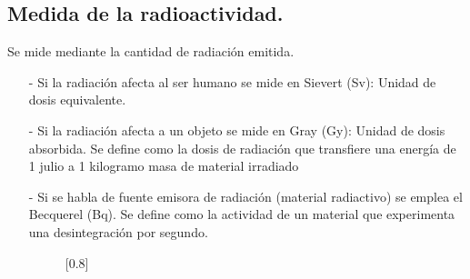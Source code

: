 \subsection{Medida de la radioactividad.}
Se mide mediante la cantidad de radiación emitida. 
\begin{itemize}
	\item [-] Si la radiación afecta al ser humano se mide en Sievert (Sv): Unidad de dosis equivalente.
	\item [-] Si la radiación afecta a un objeto se mide en Gray (Gy): Unidad de dosis absorbida. Se define como la dosis de radiación que transfiere una energía de 1 julio a 1 kilogramo masa de
	material irradiado
	\item [-] Si se habla de fuente emisora de radiación (material radiactivo) se emplea el Becquerel (Bq). Se define como la actividad de un material que experimenta una desintegración por segundo.
	
\begin{figure}[H]
	\begin{center}
	\scalebox{0.8}[0.8]{
}	\end{center}
\end{figure}	
\end{itemize}
